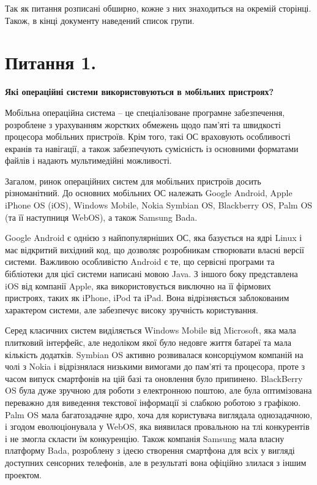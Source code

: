 \documentclass[14pt, a4paper]{extreport}
\begin{document}
	Так як питання розписані обширно, кожне з них знаходиться на окремій сторінці. Також, в кінці документу наведений список групи.
	
	\pagebreak
	
	\section*{Питання 1.}
	
	\textbf{Які операційні системи використовуються в мобільних пристроях?} 
	
	Мобільна операційна система -- це спеціалізоване програмне забезпечення, розроблене з урахуванням жорстких обмежень щодо пам'яті та швидкості процесора мобільних пристроїв. Крім того, такі ОС враховують особливості екранів та навігації, а також забезпечують сумісність із основними форматами файлів і надають мультимедійні можливості.
	
	Загалом, ринок операційних систем для мобільних пристроїв досить різноманітний. До основних мобільних ОС належать Google Android, Apple iPhone OS (iOS), Windows Mobile, Nokia Symbian OS, Blackberry OS, Palm OS (та її наступниця WebOS), а також Samsung Bada.
	
	Google Android є однією з найпопулярніших ОС, яка базується на ядрі Linux і має відкритий вихідний код, що дозволяє розробникам створювати власні версії системи. Важливою особливістю Android є те, що сервісні програми та бібліотеки для цієї системи написані мовою Java. З іншого боку представлена iOS від компанії Apple, яка використовується виключно на її фірмових пристроях, таких як iPhone, iPod та iPad. Вона відрізняється заблокованим характером системи, але забезпечує високу зручність користування.
	
	Серед класичних систем виділяється Windows Mobile від Microsoft, яка мала плитковий інтерфейс, але недоліком якої було недовге життя батареї та мала кількість додатків. Symbian OS активно розвивалася консорціумом компаній на чолі з Nokia і відрізнялася низькими вимогами до пам'яті та процесора, проте з часом випуск смартфонів на цій базі та оновлення було припинено. BlackBerry OS була дуже зручною для роботи з електронною поштою, але була оптимізована переважно для виведення текстової інформації зі слабкою роботою з графікою. Palm OS мала багатозадачне ядро, хоча для користувача виглядала однозадачною, і згодом еволюціонувала у WebOS, яка виявилася провальною на тлі конкурентів і не змогла скласти їм конкуренцію. Також компанія Samsung мала власну платформу Bada, розроблену з ідеєю створення смартфона для всіх у вигляді доступних сенсорних телефонів, але в результаті вона офіційно злилася з іншим проектом.
	
\end{document}
